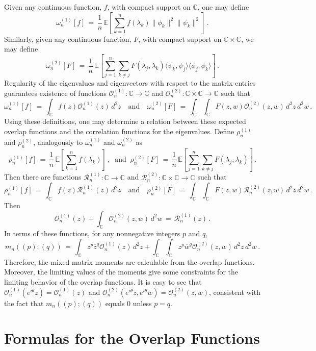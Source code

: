 \documentclass[12pt]{report}
\newcommand{\C}{\mathbb{C}}
\newcommand{\E}{\mathbb{E}}
\newcommand{\be}{\begin{equation}}
\newcommand{\ee}{\end{equation}}
\theoremstyle{definition}
\begin{document}
Given any continuous function, $f$, with compact support on $\C$, one may define
\be
\omega^{(1)}_n[f]\, =\, \frac{1}{n}\, \E\left[\sum_{k=1}^{n} f(\lambda_k) \|\phi_k\|^2 \|\psi_k\|^2\right]\, .
\ee
Similarly, given any continuous function, $F$, with compact support on $\C \times \C$, we may define
\be
\omega^{(2)}_n[F]\, =\, \frac{1}{n}\, \E\left[\sum_{j=1}^{n} \sum_{k\neq j} F(\lambda_j,\lambda_k) \langle \psi_k,\psi_j \rangle \langle \phi_j, \phi_k\rangle\right]\, .
\ee
Regularity of the eigenvalues and eigenvectors with respect to the matrix entries guarantees existence of functions $\mathcal{O}_n^{(1)} : \C \to \C$ and
$\mathcal{O}_n^{(2)} : \C \times \C \to \C$ such that
\be
\omega^{(1)}_n[f]\, =\, \int_{\C} f(z) \mathcal{O}_n^{(1)}(z)\, d^2z\quad \text{and}\quad
\omega^{(2)}_n[F]\, =\, \int_{\C}\int_{\C} F(z,w) \mathcal{O}_n^{(2)}(z,w)\, d^2z\, d^2w\, .
\ee
Using these definitions, one may determine a relation between these expected overlap functions
and the correlation functions for the eigenvalues.
Define $\rho^{(1)}_n$ and $\rho^{(2)}_n$, analogously to $\omega^{(1)}_n$ and $\omega^{(2)}_n$
as
\be
\rho^{(1)}_n[f]\, =\, \frac{1}{n}\, \E\left[\sum_{k=1}^{n} f(\lambda_k)\right]\, ,\
\text{ and }\
\rho^{(2)}_n[F]\, =\, \frac{1}{n}\, \E\left[\sum_{j=1}^{n} \sum_{k\neq j} F(\lambda_j,\lambda_k)\right]\, .
\ee
Then there are functions $\mathcal{R}_n^{(1)} : \C \to \C$ and $\mathcal{R}_n^{(2)} : \C \times \C \to \C$ such that
\be
\rho^{(1)}_n[f]\, =\, \int_{\C} f(z) \mathcal{R}_n^{(1)}(z)\, d^2z\quad \text{and}\quad
\rho^{(2)}_n[F]\, =\, \int_{\C}\int_{\C} F(z,w) \mathcal{R}_n^{(2)}(z,w)\, d^2z\, d^2w\, .
\ee
Then
\be
\mathcal{O}_n^{(1)}(z) + \int_{\C} \mathcal{O}_n^{(2)}(z,w)\, d^2w\, =\, \mathcal{R}_n^{(1)}(z)\, .
\ee
In terms of these functions, for any nonnegative integers $p$ and $q$,
\be
\label{eq:mnpq}
m_n((p);(q))\, =\, \int_{\C} z^p \overline{z}^q \mathcal{O}_n^{(1)}(z)\, d^2z 
+ \int_{\C} \int_{\C} z^p \overline{w}^q \mathcal{O}_n^{(2)}(z,w)\, d^2z\, d^2w\, .
\ee
Therefore, the mixed matrix moments are calculable from the overlap functions.
Moreover, the limiting values of the moments give some constraints for the limiting behavior of the overlap functions.
It is easy to see that $\mathcal{O}_n^{(1)}(e^{i\theta} z) = \mathcal{O}_n^{(1)}(z)$
and $\mathcal{O}_n^{(2)}(e^{i\theta}z,e^{i\theta}w) = \mathcal{O}_n^{(2)}(z,w)$,
consistent with the fact that $m_n((p);(q))$ equals $0$ unless $p=q$.

\section{Formulas for the Overlap Functions}
\end{document}
